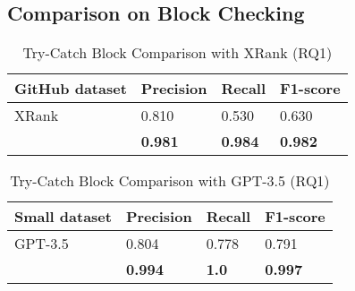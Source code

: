 \subsection{Comparison on  Block Checking}

\begin{table}[t]%
  \caption{Try-Catch Block Comparison with XRank (RQ1)}
  \vspace{-12pt}
  \small
	\begin{center}
		\renewcommand{\arraystretch}{1}
		\begin{tabular}{| p{3.05cm}<{\centering} | p{1.2cm}<{\centering} | p{1.2cm}<{\centering}| p{1.2cm}<{\centering}|}
		  \hline
			GitHub dataset  & Precision  &  Recall & F1-score \\
			\hline
			\hline
			XRank & 0.810 & 0.530 & 0.630\\
			\hline
			\tool   &  \textbf{0.981} &  {\bf 0.984} & \textbf{0.982}\\
			\hline
		\end{tabular}
		\label{tab:xblock-1}
	\end{center}
\end{table}

\begin{table}[t]%
  \caption{Try-Catch Block Comparison with GPT-3.5 (RQ1)}
  \vspace{-12pt}
  \small
	\begin{center}
		\renewcommand{\arraystretch}{1}
		\begin{tabular}{| p{1.85cm}<{\centering} | p{1.6cm}<{\centering} | p{1.6cm}<{\centering}| p{1.6cm}<{\centering}|}
		  \hline
		Small dataset	  & Precision  &  Recall & F1-score \\
			\hline
                        GPT-3.5  & 0.804  & 0.778   & 0.791\\
			\hline
			\tool   &  \textbf{0.994} &  {\bf 1.0} & \textbf{0.997}\\
			\hline
		\end{tabular}
		\label{tab:xblock-2}
	\end{center}
\end{table}



